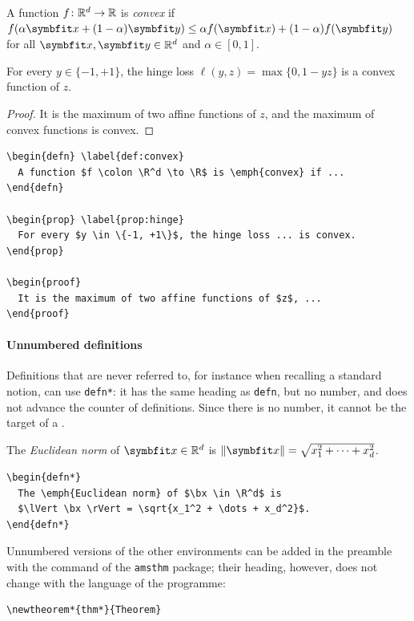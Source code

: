 \begin{defn} \label{def:convex}
  A function $f \colon \mathbb{R}^d \to \mathbb{R}$ is \emph{convex} if
  $f(\alpha \bx + (1 - \alpha) \by) \le \alpha f(\bx) + (1 - \alpha) f(\by)$
  for all $\bx, \by \in \R^d$ and $\alpha \in [0, 1]$.
\end{defn}

\begin{prop} \label{prop:hinge}
  For every $y \in \{-1, +1\}$, the hinge loss $\ell(y, z) = \max\{0, 1 - yz\}$
  is a convex function of $z$.
\end{prop}

\begin{proof}
  It is the maximum of two affine functions of $z$, and the maximum of convex
  functions is convex.
\end{proof}

\begin{Verbatim}
\begin{defn} \label{def:convex}
  A function $f \colon \R^d \to \R$ is \emph{convex} if ...
\end{defn}

\begin{prop} \label{prop:hinge}
  For every $y \in \{-1, +1\}$, the hinge loss ... is convex.
\end{prop}

\begin{proof}
  It is the maximum of two affine functions of $z$, ...
\end{proof}
\end{Verbatim}

\paragraph{Unnumbered definitions} Definitions that are never referred to,
for instance when recalling a standard notion, can use \texttt{defn*}: it
has the same heading as \texttt{defn}, but no number, and does not advance
the counter of definitions. Since there is no number, it cannot be the target of a
.

\begin{defn*}
  The \emph{Euclidean norm} of $\bx \in \R^d$ is
  $\lVert \bx \rVert = \sqrt{x_1^2 + \dots + x_d^2}$.
\end{defn*}

\begin{Verbatim}
\begin{defn*}
  The \emph{Euclidean norm} of $\bx \in \R^d$ is
  $\lVert \bx \rVert = \sqrt{x_1^2 + \dots + x_d^2}$.
\end{defn*}
\end{Verbatim}
Unnumbered versions of the other environments can be added in the preamble
with the  command of the \texttt{amsthm} package; their
heading, however, does not change with the language of the programme:
\begin{Verbatim}
\newtheorem*{thm*}{Theorem}
\end{Verbatim}

